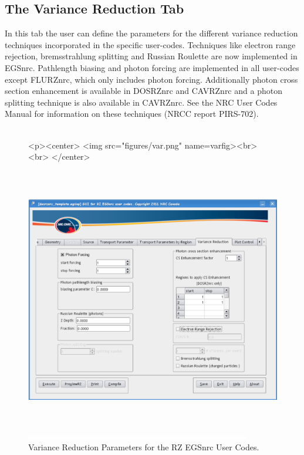 \documentclass[12pt,twoside]{article}   %
\begin{document}
\newpage
\subsection{The Variance Reduction Tab}

In this tab the user can define the parameters for the different variance reduction techniques
incorporated in the specific user-codes. Techniques like electron range rejection, 
bremsstrahlung splitting and Russian Roulette are now implemented in EGSnrc. Pathlength biasing and 
photon forcing are implemented in all user-codes except FLURZnrc, which only includes photon 
forcing. Additionally photon cross section enhancement is available in DOSRZnrc 
and CAVRZnrc and a photon splitting technique is also available in CAVRZnrc. 
See the NRC User Codes Manual for information on these techniques (NRCC report PIRS-702\cite{Ro10}).
\\ \\

\begin{figure}[htb]
\begin{htmlonly}
\begin{rawhtml}
<p><center>
<img src="figures/var.png" name=varfig><br><br>
</center>
\end{rawhtml}
\end{htmlonly}
\begin{latexonly}
\begin{center}
\includegraphics[height=11.56cm]{figures/var}
\end{center}
\end{latexonly}
\begin{center}
\includegraphics[height=1mm]{figures/fake2}
\end{center}
\caption{Variance Reduction Parameters for the RZ EGSnrc User Codes.}
\label{varfig}
\end{figure}
\end{document}
